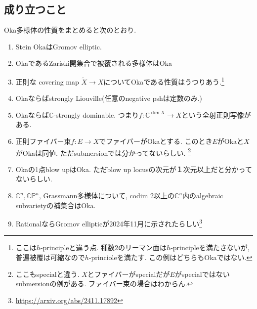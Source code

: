 \documentclass[dvipdfmx,a4paper,11pt]{article} %
\theoremstyle{definition}
\theoremstyle{remark}
\numberwithin{equation}{section}
\newcommand{\C}{\mathbb{C}}
\begin{document}
\subsection{成り立つこと}
Oka多様体の性質をまとめると次のとおり.
\begin{enumerate}
  \setlength{\parskip}{0cm} %
  \setlength{\itemsep}{0cm} 
\item Stein OkaはGromov elliptic.
\item \cite{Kus21} OkaであるZariski開集合で被覆される多様体はOka
\item \cite[Prop2.8]{For13} 正則な covering map $\tilde{X} \to X$についてOkaである性質はうつりあう.\footnote{ここは$h$-principleと違う点. 種数2のリーマン面は$h$-principleを満たさないが, 普遍被覆は可縮なので$h$-princioleを満たす. この例はどちらもOkaではない. }
\item \cite[Cor 2.9]{For13} Okaならばstrongly Liouville(任意のnegative pshは定数のみ.)
\item \cite{For18} Okaならば$\C$-strongly dominable. つまり$f : \C^{\dim X} \to X$という全射正則写像がある.
\item \cite[Theorem 2.11]{For13} 正則ファイバー束$f : E \to X$でファイバーがOkaとする. このとき$E$がOkaと$X$がOkaは同値. ただsubmersionでは分かってないらしい. \footnote{ここもspecialと違う. $X$とファイバーがspecialだが$E$がspecialではないsubmersionの例がある. ファイバー束の場合はわからん.} 
\item Okaの1点blow upはOka. ただblow up locusの次元が１次元以上だと分かってないらしい. 
\item  \cite[Theorem 2.13]{For13} $\C^n, \C\mathbb{P}^n$, Grassmann多様体について, codim 2以上の$\C^n$内のalgebraic subvarietyの補集合はOka. 
\item RationalならGromov ellipticが2024年11月に示されたらしい\footnote{\url{https://arxiv.org/abs/2411.17892}}
\end{enumerate}
\end{document}
